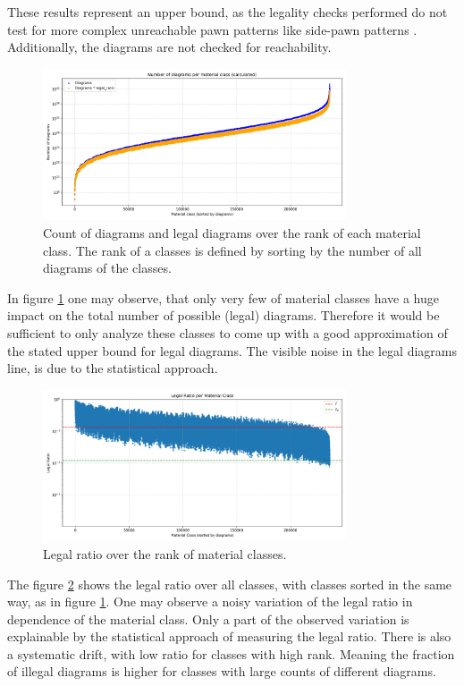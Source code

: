 \documentclass[12pt]{article}
\begin{document}
These results represent an upper bound, as the legality checks performed do not test for more complex unreachable pawn patterns like side-pawn patterns \cite{mcdonagh2022}. Additionally, the diagrams are not checked for reachability.

\begin{figure}[h!]
  \centering
  \includegraphics[width=0.8\textwidth]{diagrams_per_class.png}
  \caption{Count of diagrams and legal diagrams over the rank of each material class. The rank of a classes is defined by sorting by the number of all diagrams of the classes.}
  \label{fig:diagrams_per_class}
\end{figure}
In figure \ref{fig:diagrams_per_class} one may observe, that only very few of material classes have a huge impact on the total number of possible (legal) diagrams. Therefore it would be sufficient to only analyze these classes to come up with a good approximation of the stated upper bound for legal diagrams. The visible noise in the legal diagrams line, is due to the statistical approach.

\begin{figure}[h!]
  \centering
  \includegraphics[width=0.8\textwidth]{legal_ratio_per_class.png}
  \caption{Legal ratio over the rank of material classes.}
  \label{fig:legal_ratio_by_class}
\end{figure}

The figure \ref{fig:legal_ratio_by_class} shows the legal ratio over all classes, with classes sorted in the same way, as in figure \ref{fig:diagrams_per_class}. One may observe a noisy variation of the legal ratio in dependence of the material class. Only a part of the observed variation is explainable by the statistical approach of measuring the legal ratio. There is also a systematic drift, with low ratio for classes with high rank. Meaning the fraction of illegal diagrams is higher for classes with large counts of different diagrams.
\end{document}

